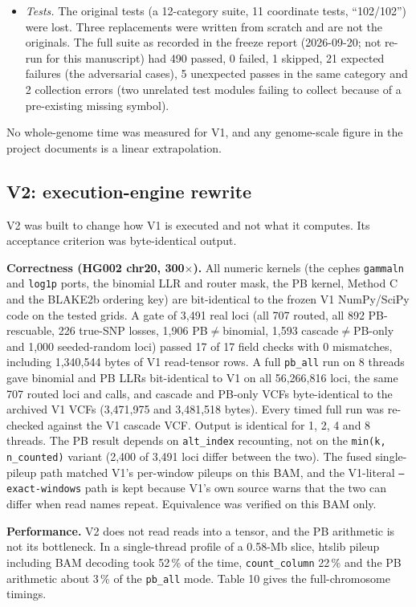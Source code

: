 \documentclass[11pt,a4paper]{article}
\makeatletter
\newcommand{\needspace}[1]{\par\ifdim\pagegoal=\maxdimen\else\dimen@=\pagegoal\advance\dimen@-\pagetotal\ifdim\dimen@<#1\relax\newpage\fi\fi}
\makeatother
\begin{document}
\begin{itemize}[leftmargin=1.6em,itemsep=2pt,topsep=3pt]
\item \emph{Tests.} The original tests (a 12-category suite, 11 coordinate tests, ``102/102'') were lost. Three replacements were written from scratch and are not the originals. The full suite as recorded in the freeze report (2026-09-20; not re-run for this manuscript) had 490 passed, 0 failed, 1 skipped, 21 expected failures (the adversarial cases), 5 unexpected passes in the same category and 2 collection errors (two unrelated test modules failing to collect because of a pre-existing missing symbol).
\end{itemize}
No whole-genome time was measured for V1, and any genome-scale figure in the project documents is a linear extrapolation.

\needspace{6\baselineskip}
\subsection{\texorpdfstring{V2: execution-engine rewrite}{V2: execution-engine rewrite}}
V2 was built to change how V1 is executed and not what it computes. Its acceptance criterion was byte-identical output.

\textbf{Correctness (HG002 chr20, 300$\times$).} All numeric kernels (the cephes \texttt{gammaln} and \texttt{log1p} ports, the binomial LLR and router mask, the PB kernel, Method C and the BLAKE2b ordering key) are bit-identical to the frozen V1 NumPy/SciPy code on the tested grids. A gate of 3,491 real loci (all 707 routed, all 892 PB-rescuable, 226 true-SNP losses, 1,906 PB$\ne$binomial, 1,593 cascade$\ne$PB-only and 1,000 seeded-random loci) passed 17 of 17 field checks with 0 mismatches, including 1,340,544 bytes of V1 read-tensor rows. A full \texttt{pb\_\allowbreak{}all} run on 8 threads gave binomial and PB LLRs bit-identical to V1 on all 56,266,816 loci, the same 707 routed loci and calls, and cascade and PB-only VCFs byte-identical to the archived V1 VCFs (3,471,975 and 3,481,518 bytes). Every timed full run was re-checked against the V1 cascade VCF. Output is identical for 1, 2, 4 and 8 threads. The PB result depends on \texttt{alt\_\allowbreak{}index} recounting, not on the \texttt{min(k, n\_\allowbreak{}counted)} variant (2,400 of 3,491 loci differ between the two). The fused single-pileup path matched V1's per-window pileups on this BAM, and the V1-literal \texttt{--exact-windows} path is kept because V1's own source warns that the two can differ when read names repeat. Equivalence was verified on this BAM only.

\textbf{Performance.} V2 does not read reads into a tensor, and the PB arithmetic is not its bottleneck. In a single-thread profile of a 0.58-Mb slice, htslib pileup including BAM decoding took 52\,\% of the time, \texttt{count\_\allowbreak{}column} 22\,\% and the PB arithmetic about 3\,\% of the \texttt{pb\_\allowbreak{}all} mode. Table 10 gives the full-chromosome timings.
\end{document}
